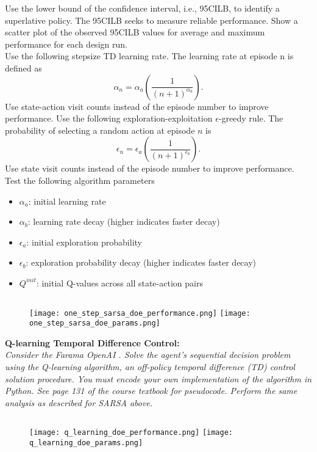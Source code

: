 \documentclass[12pt,letterpaper]{exam}
\begin{document}
\begin{questions}
{Use the lower bound of the confidence interval, i.e., 95CILB, to identify a superlative policy. 
The 95CILB seeks to measure reliable performance. Show a scatter plot of the observed 95CILB 
values for average and maximum performance for each design run.
\\[0.25em]
Use the following stepsize TD learning rate. The learning rate at episode n is defined as
\[ \alpha_n = \alpha_a \left(\frac{1}{(n+1)^{\alpha_b}}\right). \]
Use state-action visit counts instead of the episode number to improve performance.
Use the following exploration-exploitation \(\epsilon\)-greedy rule. 
The probability of selecting a random action at episode \(n\) is
\[ \epsilon_n = \epsilon_a \left(\frac{1}{(n+1)^{\epsilon_b}}\right). \]
Use state visit counts instead of the episode number to improve performance.
Test the following algorithm parameters
\vspace*{-0.75em}
\begin{itemize}
    \setlength\itemsep{-0.25em}
    \item \(\alpha_a\): initial learning rate
    \item \(\alpha_b\): learning rate decay (higher indicates faster decay)
    \item \(\epsilon_a\): initial exploration probability
    \item \(\epsilon_b\): exploration probability decay (higher indicates faster decay)
    \item \(Q^{init}\): initial Q-values across all state-action pairs
\end{itemize}
}
\inputminted{python3}{scripts/SARSA.py}
\begin{figure}[H]
    \texttt{[image: one\_step\_sarsa\_doe\_performance.png]}
    \texttt{[image: one\_step\_sarsa\_doe\_params.png]}
\end{figure}
{\footnotesize{}}


\question%
\textbf{Q-learning Temporal Difference Control:} \\
\emph{ 
Consider the Farama OpenAI .
Solve the agent’s sequential decision problem using the Q-learning algorithm, 
an off-policy temporal difference (TD) control solution procedure. 
You must encode your own implementation of the algorithm in Python. 
See page 131 of the course textbook for pseudocode. 
Perform the same analysis as described for SARSA above.
}
\inputminted{python3}{scripts/QLearning.py}
\begin{figure}[H]
    \texttt{[image: q\_learning\_doe\_performance.png]}
    \texttt{[image: q\_learning\_doe\_params.png]}
\end{figure}
{\footnotesize{}}


\end{questions}
\end{document}
